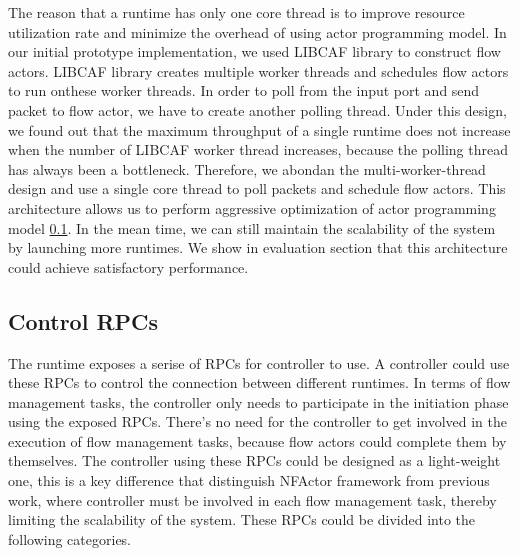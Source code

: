 
The reason that a runtime has only one core thread is to improve resource utilization rate and minimize the overhead of using actor programming model. In our initial prototype implementation, we used LIBCAF \cite{caf} library to construct flow actors. LIBCAF library creates multiple worker threads and schedules flow actors to run onthese worker threads. In order to poll from the input port and send packet to flow actor, we have to create another polling thread. Under this design, we found out that the maximum throughput of a single runtime does not increase when the number of LIBCAF worker thread increases, because the polling thread has always been a bottleneck. Therefore, we abondan the multi-worker-thread design and use a single core thread to poll packets and schedule flow actors. This architecture allows us to perform aggressive optimization of actor programming model \ref{}. In the mean time, we can still maintain the scalability of the system by launching more runtimes. We show in evaluation section that this architecture could achieve satisfactory performance.

\subsection{Control RPCs}

The runtime exposes a serise of RPCs for controller to use. A controller could use these RPCs to control the connection between different runtimes. In terms of flow management tasks, the controller only needs to participate in the initiation phase using the exposed RPCs. There's no need for the controller to get involved in the execution of flow management tasks, because flow actors could complete them by themselves. The controller using these RPCs could be designed as a light-weight one, this is a key difference that distinguish NFActor framework from previous work, where controller must be involved in each flow management task, thereby limiting the scalability of the system. These RPCs could be divided into the following categories.


